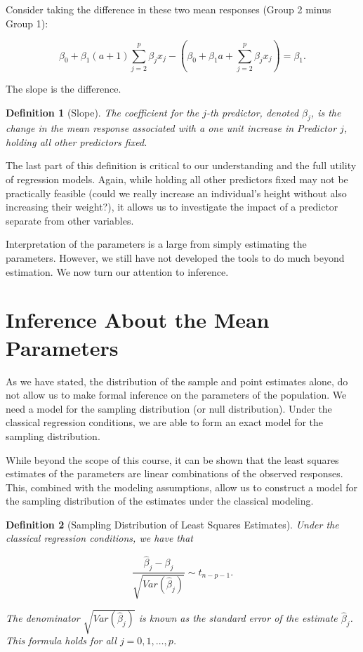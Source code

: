 \documentclass[
]{book}
\theoremstyle{plain}
\theoremstyle{mydefn}
\newtheorem{definition}{Definition}[chapter]
\theoremstyle{myexmpl}
\theoremstyle{remark}
\begin{document}
Consider taking the difference in these two mean responses (Group 2 minus Group 1):

\[\beta_0 + \beta_1 (a + 1) \sum_{j=2}^{p} \beta_j x_j - \left(\beta_0 + \beta_1 a + \sum_{j=2}^{p} \beta_j x_j\right) = \beta_1.\]

The slope is the difference.

\begin{definition}[Slope]
\protect\hypertarget{def:defn-slope}{}{\label{def:defn-slope} {} }The coefficient for the \(j\)-th predictor, denoted \(\beta_j\), is the change in the mean response associated with a one unit increase in Predictor \(j\), \emph{holding all other predictors fixed}.
\end{definition}

The last part of this definition is critical to our understanding and the full utility of regression models. Again, while holding all other predictors fixed may not be practically feasible (could we really increase an individual's height without also increasing their weight?), it allows us to investigate the impact of a predictor separate from other variables.

Interpretation of the parameters is a large from simply estimating the parameters. However, we still have not developed the tools to do much beyond estimation. We now turn our attention to inference.

\hypertarget{inference-about-the-mean-parameters}{%
\section{Inference About the Mean Parameters}\label{inference-about-the-mean-parameters}}

As we have stated, the distribution of the sample and point estimates alone, do not allow us to make formal inference on the parameters of the population. We need a model for the sampling distribution (or null distribution). Under the classical regression conditions, we are able to form an exact model for the sampling distribution.

While beyond the scope of this course, it can be shown that the least squares estimates of the parameters are linear combinations of the observed responses. This, combined with the modeling assumptions, allow us to construct a model for the sampling distribution of the estimates under the classical modeling.

\begin{definition}[Sampling Distribution of Least Squares Estimates]
\protect\hypertarget{def:defn-ls-sampling-distribution}{}{\label{def:defn-ls-sampling-distribution} {} }Under the classical regression conditions, we have that

\[\frac{\widehat{\beta}_j - \beta_j}{\sqrt{Var\left(\widehat{\beta}_j\right)}} \sim t_{n - p - 1}.\]

The denominator \(\sqrt{Var\left(\widehat{\beta}_j\right)}\) is known as the \emph{standard error} of the estimate \(\widehat{\beta}_j\). This formula holds for all \(j = 0, 1, \dotsc, p\).
\end{definition}
\end{document}
